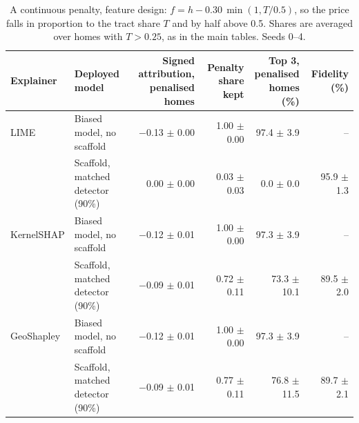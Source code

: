 \begin{table}[t]
\centering
\footnotesize
\setlength{\tabcolsep}{3.5pt}
\begin{adjustbox}{max width=\linewidth}
\begin{tabular}{llrrrr}
\toprule
Explainer & \makecell[b]{Deployed \\ model} & \makecell[b]{Signed \\ attribution, \\ penalised \\ homes} & \makecell[b]{Penalty share \\ kept} & \makecell[b]{Top 3, \\ penalised \\ homes (\%)} & Fidelity (\%) \\
\midrule
LIME & Biased model, no scaffold & $-$0.13 $\pm$ 0.00 & 1.00 $\pm$ 0.00 & 97.4 $\pm$ 3.9 & -- \\
 & Scaffold, matched detector (90\%) & 0.00 $\pm$ 0.00 & 0.03 $\pm$ 0.03 & 0.0 $\pm$ 0.0 & 95.9 $\pm$ 1.3 \\
\midrule
KernelSHAP & Biased model, no scaffold & $-$0.12 $\pm$ 0.01 & 1.00 $\pm$ 0.00 & 97.3 $\pm$ 3.9 & -- \\
 & Scaffold, matched detector (90\%) & $-$0.09 $\pm$ 0.01 & 0.72 $\pm$ 0.11 & 73.3 $\pm$ 10.1 & 89.5 $\pm$ 2.0 \\
\midrule
GeoShapley & Biased model, no scaffold & $-$0.12 $\pm$ 0.01 & 1.00 $\pm$ 0.00 & 97.3 $\pm$ 3.9 & -- \\
 & Scaffold, matched detector (90\%) & $-$0.09 $\pm$ 0.01 & 0.77 $\pm$ 0.11 & 76.8 $\pm$ 11.5 & 89.7 $\pm$ 2.1 \\
\bottomrule
\end{tabular}
\end{adjustbox}
\caption{A continuous penalty, feature design: $f = h - 0.30\,\min(1, T/0.5)$, so the price falls in proportion to the tract share $T$ and by half above 0.5. Shares are averaged over homes with $T > 0.25$, as in the main tables. Seeds 0--4.}
\label{tab:ramp}
\end{table}
